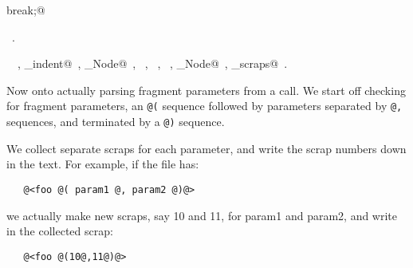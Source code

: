 \documentclass[a4paper]{report}
\begin{document}
\begin{flushleft}
\begin{list}{}{}
\mbox{}\verb@      break;@\\
\mbox{}\verb@@{\NWsep}
\end{list}
\vspace{-1.5ex}
\footnotesize
\begin{list}{}{\setlength{\itemsep}{-\parsep}\setlength{\itemindent}{-\leftmargin}}
\item \NWtxtMacroRefIn\ .
\item \NWtxtIdentsUsed\nobreak\  \verb@Arglist@\nobreak\ , \verb@delayed_indent@\nobreak\ , \verb@Embed_Node@\nobreak\ , \verb@fputs@\nobreak\ , \verb@lookup@\nobreak\ , \verb@Name@\nobreak\ , \verb@Scrap_Node@\nobreak\ , \verb@write_scraps@\nobreak\ .
\item{}
\end{list}
\vspace{4ex}
\end{flushleft}
Now onto actually parsing fragment parameters from a call.
We start off checking for fragment parameters, an \verb|@(| sequence
followed by parameters separated by \verb|@,| sequences, and
terminated by a \verb|@)| sequence.

We collect separate scraps for each parameter, and write the
scrap numbers down in the text. For example, if the file has:
\begin{verbatim}
   @<foo @( param1 @, param2 @)@>
\end{verbatim}
we actually make new scraps, say 10 and 11, for param1 and param2,
and write in the collected scrap:
\begin{verbatim}
   @<foo @(10@,11@)@>
\end{verbatim}
\end{document}
